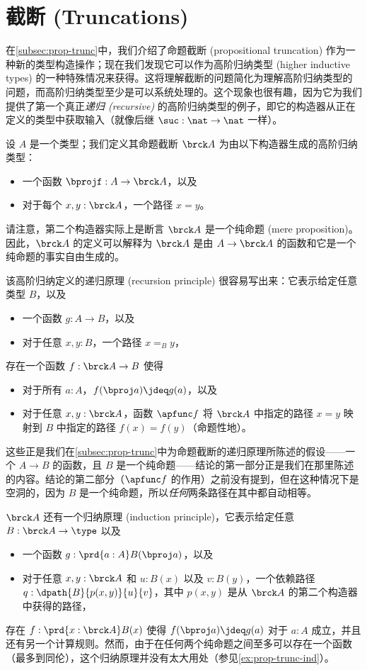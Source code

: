 \section{截断 (Truncations)}
\label{sec:hittruncations}

%
在\cref{subsec:prop-trunc}中，我们介绍了命题截断 (propositional truncation) 作为一种新的类型构造操作；现在我们发现它可以作为高阶归纳类型 (higher inductive types) 的一种特殊情况来获得。这将理解截断的问题简化为理解高阶归纳类型的问题，而高阶归纳类型至少是可以系统处理的。这个现象也很有趣，因为它为我们提供了第一个真正\emph{递归 (recursive)} 的高阶归纳类型的例子，即它的构造器从正在定义的类型中获取输入（就像后继 $\suc:\nat\to\nat$ 一样）。

设 $A$ 是一个类型；我们定义其命题截断 $\brck A$ 为由以下构造器生成的高阶归纳类型：
\begin{itemize}
  \item 一个函数 $\bprojf : A \to \brck A$，以及
  \item 对于每个 $x,y:\brck A$，一个路径 $x=y$。
\end{itemize}
请注意，第二个构造器实际上是断言 $\brck A$ 是一个纯命题 (mere proposition)。因此，$\brck A$ 的定义可以解释为 $\brck A$ 是由 $A\to\brck A$ 的函数和它是一个纯命题的事实自由生成的。

该高阶归纳定义的递归原理 (recursion principle) 很容易写出来：它表示给定任意类型 $B$，以及
\begin{itemize}
  \item 一个函数 $g:A\to B$，以及
  \item 对于任意 $x,y:B$，一个路径 $x=_B y$，
\end{itemize}
存在一个函数 $f:\brck A \to B$ 使得
\begin{itemize}
  \item 对于所有 $a:A$，$f(\bproj a) \jdeq g(a)$，以及
  \item 对于任意 $x,y:\brck A$，函数 $\apfunc f$ 将 $\brck A$ 中指定的路径 $x=y$ 映射到 $B$ 中指定的路径 $f(x) = f(y)$（命题性地）。
\end{itemize}
%
这些正是我们在\cref{subsec:prop-trunc}中为命题截断的递归原理所陈述的假设——一个 $A\to B$ 的函数，且 $B$ 是一个纯命题——结论的第一部分正是我们在那里陈述的内容。结论的第二部分（$\apfunc f$ 的作用）之前没有提到，但在这种情况下是空洞的，因为 $B$ 是一个纯命题，所以\emph{任何}两条路径在其中都自动相等。

%
$\brck A$ 还有一个归纳原理 (induction principle)，它表示给定任意 $B:\brck A \to \type$ 以及
\begin{itemize}
  \item 一个函数 $g:\prd{a:A} B(\bproj a)$，以及
  \item 对于任意 $x,y:\brck A$ 和 $u:B(x)$ 以及 $v:B(y)$，一个依赖路径 $q:\dpath{B}{p(x,y)}{u}{v}$，其中 $p(x,y)$ 是从 $\brck A$ 的第二个构造器中获得的路径，
\end{itemize}
存在 $f:\prd{x:\brck A} B(x)$ 使得 $f(\bproj a)\jdeq g(a)$ 对于 $a:A$ 成立，并且还有另一个计算规则。然而，由于在任何两个纯命题之间至多可以存在一个函数（最多到同伦），这个归纳原理并没有太大用处（参见\cref{ex:prop-trunc-ind}）。

